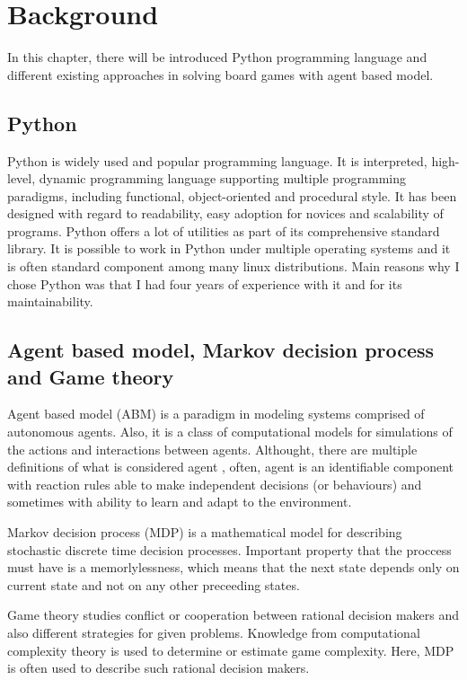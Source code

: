 \chapter{Background}\label{chap:2}
  In this chapter, there will be introduced Python programming language and
different existing approaches in solving board games with agent based model.

\section{Python}
Python is widely used and popular
programming language. It is interpreted, high-level, dynamic programming
language supporting multiple programming paradigms, including functional,
object-oriented and procedural style. It has been designed with regard to
readability, easy adoption for novices and scalability of programs. Python
offers a lot of utilities as part of its comprehensive standard library. It is
possible to work in Python under multiple operating systems and it is often
standard component among many linux distributions. Main reasons why I chose
Python was that I had four years of experience with it and for its
maintainability.

\section{Agent based model, Markov decision process and Game theory}
Agent based model (ABM) is a paradigm in modeling systems comprised
of autonomous agents. Also, it is a class of computational models for
simulations of the actions and interactions between agents. Althought, there
are multiple definitions of what is considered agent \cite{abm}, often, agent
is an identifiable component with reaction rules able to make independent
decisions (or behaviours) and sometimes with ability to learn and adapt to
the environment.

Markov decision process (MDP) is a mathematical model for describing stochastic
discrete time decision processes. Important property that the proccess must
have is a memorlylessness, which means that the next state depends only
on current state and not on any other preceeding states.

Game theory studies conflict or cooperation between rational decision makers
and also different strategies for given problems. Knowledge from computational
complexity theory is used to determine or estimate game complexity. Here, MDP
is often used to describe such rational decision makers.

